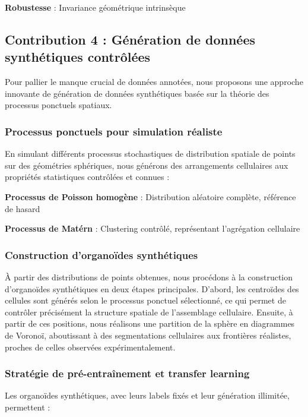 \textbf{Robustesse} : Invariance géométrique intrinsèque

\subsection{Contribution 4 : Génération de données synthétiques contrôlées}

Pour pallier le manque crucial de données annotées, nous proposons une approche innovante de génération de données synthétiques basée sur la théorie des processus ponctuels spatiaux.

\subsubsection{Processus ponctuels pour simulation réaliste}

En simulant différents processus stochastiques de distribution spatiale de points~\cite{Illian2008,Diggle2013} sur des géométries sphériques, nous générons des arrangements cellulaires aux propriétés statistiques contrôlées et connues :

\textbf{Processus de Poisson homogène} : Distribution aléatoire complète, référence de hasard

\textbf{Processus de Matérn} : Clustering contrôlé, représentant l'agrégation cellulaire

\subsubsection{Construction d'organoïdes synthétiques}

À partir des distributions de points obtenues, nous procédons à la construction d’organoïdes synthétiques en deux étapes principales. D’abord, les centroïdes des cellules sont générés selon le processus ponctuel sélectionné, ce qui permet de contrôler précisément la structure spatiale de l’assemblage cellulaire. Ensuite, à partir de ces positions, nous réalisons une partition de la sphère en diagrammes de Voronoï, aboutissant à des segmentations cellulaires aux frontières réalistes, proches de celles observées expérimentalement.

\subsubsection{Stratégie de pré-entraînement et transfer learning}

Les organoïdes synthétiques, avec leurs labels fixés et leur génération illimitée, permettent :

